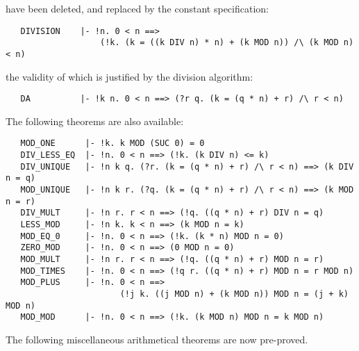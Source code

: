 \noindent have been deleted, and replaced by the constant specification:

\begin{hol}\begin{verbatim}
   DIVISION    |- !n. 0 < n ==>
                   (!k. (k = ((k DIV n) * n) + (k MOD n)) /\ (k MOD n) < n)
\end{verbatim}\end{hol}

\noindent the validity of which is justified by the division algorithm:

\begin{hol}\begin{verbatim}
   DA          |- !k n. 0 < n ==> (?r q. (k = (q * n) + r) /\ r < n)
\end{verbatim}\end{hol}

The following theorems are also available:

\begin{hol}\begin{verbatim}
   MOD_ONE      |- !k. k MOD (SUC 0) = 0
   DIV_LESS_EQ  |- !n. 0 < n ==> (!k. (k DIV n) <= k)
   DIV_UNIQUE   |- !n k q. (?r. (k = (q * n) + r) /\ r < n) ==> (k DIV n = q)
   MOD_UNIQUE   |- !n k r. (?q. (k = (q * n) + r) /\ r < n) ==> (k MOD n = r)
   DIV_MULT     |- !n r. r < n ==> (!q. ((q * n) + r) DIV n = q)
   LESS_MOD     |- !n k. k < n ==> (k MOD n = k)
   MOD_EQ_0     |- !n. 0 < n ==> (!k. (k * n) MOD n = 0)
   ZERO_MOD     |- !n. 0 < n ==> (0 MOD n = 0)
   MOD_MULT     |- !n r. r < n ==> (!q. ((q * n) + r) MOD n = r)
   MOD_TIMES    |- !n. 0 < n ==> (!q r. ((q * n) + r) MOD n = r MOD n)
   MOD_PLUS     |- !n. 0 < n ==>
                       (!j k. ((j MOD n) + (k MOD n)) MOD n = (j + k) MOD n)
   MOD_MOD      |- !n. 0 < n ==> (!k. (k MOD n) MOD n = k MOD n)
\end{verbatim}\end{hol}



The following miscellaneous arithmetical theorems
are now pre-proved.

